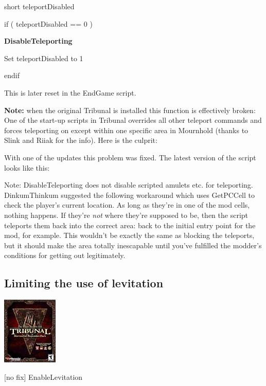 \documentclass[
]{article}
\begin{document}
short teleportDisabled

if ( teleportDisabled == 0 )

\textbf{DisableTeleporting}

Set teleportDisabled to 1

endif

This is later reset in the EndGame script.

\textbf{Note:} when the original Tribunal is installed this function is
effectively broken: One of the start-up scripts in Tribunal overrides
all other teleport commands and forces teleporting on except within one
specific area in Mournhold (thanks to Slink and Riiak for the info).
Here is the culprit:



With one of the updates this problem was fixed. The latest version of
the script looks like this:



Note: DisableTeleporting does not disable scripted amulets etc. for
teleporting. DinkumThinkum suggested the following workaround which uses
GetPCCell to check the player's current location. As long as they're in
one of the mod cells, nothing happens. If they're \emph{not} where
they're supposed to be, then the script teleports them back into the
correct area: back to the initial entry point for the mod, for example.
This wouldn't be exactly the same as blocking the teleports, but it
should make the area totally inescapable until you've fulfilled the
modder's conditions for getting out legitimately.



\hypertarget{limiting-the-use-of-levitation}{%
\subsection{Limiting the use of
levitation}\label{limiting-the-use-of-levitation}}

\includegraphics{media/image6.png}

{[}no fix{]} EnableLevitation
\end{document}
